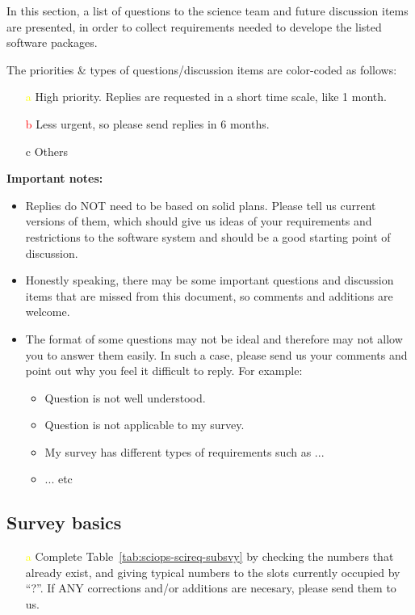 \documentclass[a4paper,notitlepage]{article}
\newcommand{\cols}[1]{\textcolor{red}{#1}}
\newcommand{\colm}[1]{\textcolor{yellow}{#1}}
\begin{document}
In this section, a list of questions to the science team and future
discussion items are presented, in order to collect requirements needed
to develope the listed software packages.

The priorities \& types of questions/discussion items are color-coded as
follows:
\begin{enumerate}
  \item[\colm{a}] High priority. Replies are requested in a short time
           scale, like 1 month.
  \item[\cols{b}] Less urgent, so please send replies in 6 months.
  \item[c] Others
\end{enumerate}

{\bf Important notes:}
\begin{itemize}
 \item Replies do NOT need to be based on solid plans. Please tell us
       current versions of them, which should give us ideas of your
       requirements and restrictions to the software system and should
       be a good starting point of discussion.
 \item Honestly speaking, there may be some important questions and
       discussion items that are missed from this document, so comments
       and additions are welcome.
 \item The format of some questions may not be ideal and therefore may
       not allow you to answer them easily. In such a case, please send
       us your comments and point out why you feel it difficult to
       reply. For example:
       \begin{itemize}
    \item Question is not well understood.
    \item Question is not applicable to my survey.
    \item My survey has different types of requirements such as ... 
    \item ... etc
       \end{itemize}
\end{itemize}

\subsection{Survey basics}

\begin{enumerate}
  \item[\colm{a}] Complete Table~\ref{tab:sciops-scireq-subsvy} by
           checking the numbers that already exist, and giving
           typical numbers to the slots currently occupied by
           ``?''. If ANY corrections and/or additions are necesary,
           please send them to us.
\end{enumerate}
\end{document}
